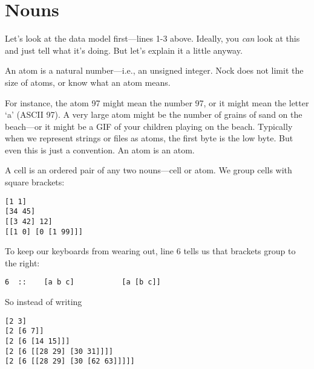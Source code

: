 \section{Nouns}

Let's look at the data model first---lines 1-3 above.  Ideally,
you \emph{can} look at this and just tell what it's doing.  But let's
explain it a little anyway.

An atom is a natural number---i.e., an unsigned integer.  Nock does
not limit the size of atoms, or know what an atom means.

For instance, the atom 97 might mean the number 97, or it might
mean the letter `a' (ASCII 97).  A very large atom might be the
number of grains of sand on the beach---or it might be a GIF of
your children playing on the beach.  Typically when we represent
strings or files as atoms, the first byte is the low byte.  But
even this is just a convention.  An atom is an atom.

A cell is an ordered pair of any two nouns---cell or atom.  We
group cells with square brackets:

\begin{framed_shaded}
\begin{Verbatim}[fontsize=\relsize{-2.5},fontseries=b,commandchars=\\\{\}]
[1 1]
[34 45]
[[3 42] 12]
[[1 0] [0 [1 99]]]
\end{Verbatim}
\end{framed_shaded}

To keep our keyboards from wearing out, line 6 tells us that
brackets group to the right:

\begin{framed_shaded}
\begin{Verbatim}[fontsize=\relsize{-2.5},fontseries=b,commandchars=\\\{\}]
6  ::    [a b c]           [a [b c]]
\end{Verbatim}
\end{framed_shaded}

So instead of writing

\begin{framed_shaded}
\begin{Verbatim}[fontsize=\relsize{-2.5},fontseries=b,commandchars=\\\{\}]
[2 3]
[2 [6 7]]
[2 [6 [14 15]]]
[2 [6 [[28 29] [30 31]]]]
[2 [6 [[28 29] [30 [62 63]]]]]
\end{Verbatim}
\end{framed_shaded}


